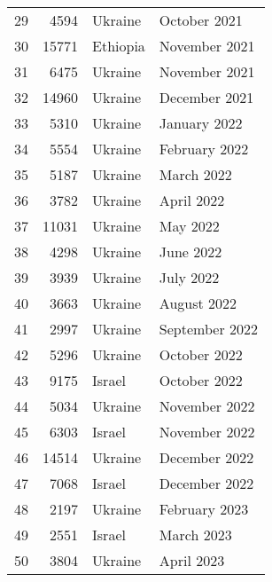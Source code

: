 \begin{table}[ht]
\begin{tabular}{rrll}
  29 & 4594 & Ukraine & October 2021 \\ 
  30 & 15771 & Ethiopia & November 2021 \\ 
  31 & 6475 & Ukraine & November 2021 \\ 
  32 & 14960 & Ukraine & December 2021 \\ 
  33 & 5310 & Ukraine & January 2022 \\ 
  34 & 5554 & Ukraine & February 2022 \\ 
  35 & 5187 & Ukraine & March 2022 \\ 
  36 & 3782 & Ukraine & April 2022 \\ 
  37 & 11031 & Ukraine & May 2022 \\ 
  38 & 4298 & Ukraine & June 2022 \\ 
  39 & 3939 & Ukraine & July 2022 \\ 
  40 & 3663 & Ukraine & August 2022 \\ 
  41 & 2997 & Ukraine & September 2022 \\ 
  42 & 5296 & Ukraine & October 2022 \\ 
  43 & 9175 & Israel & October 2022 \\ 
  44 & 5034 & Ukraine & November 2022 \\ 
  45 & 6303 & Israel & November 2022 \\ 
  46 & 14514 & Ukraine & December 2022 \\ 
  47 & 7068 & Israel & December 2022 \\ 
  48 & 2197 & Ukraine & February 2023 \\ 
  49 & 2551 & Israel & March 2023 \\ 
  50 & 3804 & Ukraine & April 2023 \\ 
   \hline
\end{tabular}
\end{table}
